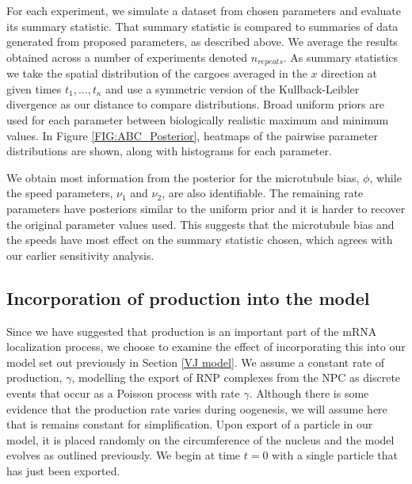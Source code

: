 \documentclass[twocolumn]{biophys}
\newlength\tindent
\renewcommand{\indent}{\hspace*{\tindent}}
\begin{document}
\indent For each experiment, we simulate a dataset from chosen parameters and evaluate its summary statistic. 
That summary statistic is compared to summaries of data generated from proposed parameters, as described above.
We average the results obtained across a number of experiments denoted $n_{repeats}$.
As summary statistics we take the spatial distribution of the cargoes averaged in the $x$ direction at given times $t_1,...,t_{\kappa}$ and use a symmetric version of the Kullback-Leibler divergence as our distance to compare distributions.
Broad uniform priors are used for each parameter between biologically realistic maximum and minimum values.
In Figure \ref{FIG:ABC_Posterior}, heatmaps of the pairwise parameter distributions are shown, along with histograms for each parameter. 

\indent We obtain most information from the posterior for the microtubule bias, $\phi$, while the speed parameters, $\nu_1$ and $\nu_2$, are also identifiable. 
The remaining rate parameters have posteriors similar to the uniform prior and it is harder to recover the original parameter values used.
This suggests that the microtubule bias and the speeds have most effect on the summary statistic chosen, which agrees with our earlier sensitivity analysis.

\subsection{Incorporation of production into the model}

Since we have suggested that production is an important part of the mRNA localization process, we choose to examine the effect of incorporating this into our model set out previously in Section \ref{VJ model}.
We assume a constant rate of production, $\gamma$, modelling the export of RNP complexes from the NPC as discrete events that occur as a Poisson process with rate $\gamma$.
Although there is some evidence that the production rate varies during oogenesis, we will assume here that is remains constant for simplification.
Upon export of a particle in our model, it is placed randomly on the circumference of the nucleus and the model evolves as outlined previously.
We begin at time $t=0$ with a single particle that has just been exported. 
\end{document}
